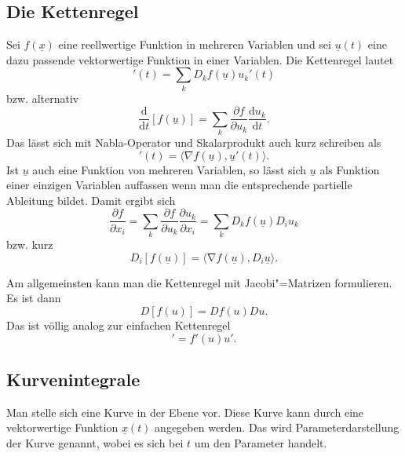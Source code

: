 \documentclass[a4paper,10pt,fleqn,twocolumn,twoside]{article}
\numberwithin{equation}{section}
\begin{document}
\subsection{Die Kettenregel}

Sei $f(\underline x)$ eine reellwertige Funktion in mehreren
Variablen und sei $\underline u(t)$ eine dazu passende
vektorwertige Funktion in einer Variablen. Die Kettenregel lautet
\begin{equation}
[f(\underline u)]'(t) = \sum_k D_kf(\underline u)u_k'(t)
\end{equation}
bzw. alternativ
\begin{equation}
\frac{\mathrm d}{\mathrm dt}[f(\underline u)]
= \sum_k \frac{\partial f}{\partial u_k}\frac{\mathrm du_k}{\mathrm dt}.
\end{equation}
\noindent
Das lässt sich mit Nabla-Operator und Skalarprodukt auch kurz schreiben als
\begin{equation}
[f(\underline u)]'(t)
= \langle\nabla f(\underline u),\underline u'(t)\rangle.
\end{equation}
Ist $\underline u$ auch eine Funktion von mehreren Variablen,
so lässt sich $\underline u$
als Funktion einer einzigen Variablen auffassen wenn man die entsprechende
partielle Ableitung bildet. Damit ergibt sich
\begin{equation}
\frac{\partial f}{\partial x_i}
= \sum_k\frac{\partial f}{\partial u_k}\frac{\partial u_k}{\partial x_i}
= \sum_k D_k f(\underline u) D_i u_k
\end{equation}
bzw. kurz
\begin{equation}
D_i [f(\underline u)] = \langle\mathrm \nabla f(\underline u),
D_i\underline u\rangle.
\end{equation}

\noindent
Am allgemeinsten kann man die Kettenregel mit Jacobi"=Matrizen
formulieren.
Es ist dann
\begin{equation}
D[f(u)] = Df(u)Du.
\end{equation}
\noindent
Das ist völlig analog zur einfachen Kettenregel
\begin{equation}
[f(u)]' = f'(u)u'.
\end{equation}

\subsection{Kurvenintegrale}

Man stelle sich eine Kurve in der Ebene vor. Diese Kurve kann durch
eine vektorwertige Funktion $\underline x(t)$ angegeben werden.
Das wird Parameterdarstellung der Kurve genannt, wobei es sich bei
$t$ um den Parameter handelt.
\end{document}

